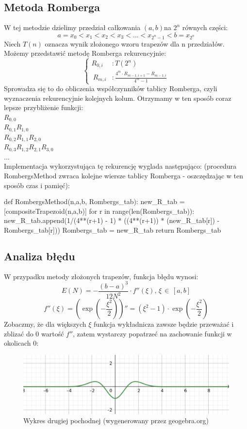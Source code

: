 \documentclass[a4paper]{article}
\begin{document}
\subsection{Metoda Romberga}
W tej metodzie dzielimy przedział całkowania $(a,b)$na $2^n$ równych części:
$$a = x_0 < x_1 < x_2 < x_3 < \ldots < x_{2^n-1} < b = x_{2^n}$$
Niech $T(n)$ oznacza wynik złożonego wzoru trapezów dla n przedziałów. Możemy przedstawić metodę Romberga rekurencyjnie:
$$
\begin{cases}
R_{0,i} &: T(2^n)\\ 
\ R_{m,i} &: \frac{4^m\cdot R_{m-1,i+1}-R_{m-1,i}}{4^m-1}
\end{cases}
$$
Sprowadza się to do obliczenia współczynników tablicy Romberga, czyli wyznaczenia rekurencyjnie kolejnych kolum. Otrzymamy w ten sposób coraz lepsze przybliżenie funkcji: \\
$R_{0,0}$ \\
$R_{0,1}$$R_{1,0}$ \\
$R_{0,2}$$R_{1,1}$$R_{2,0}$ \\
$R_{0,3}$$R_{1,2}$$R_{2,1}$$R_{3,0}$\\
$\ldots$ \\
Implementacja wykorzystująca tę rekurencję wyglada następująco: (procedura RombergsMethod zwraca kolejne wiersze tablicy Romberga - oszczędzając w ten sposób czas i pamięć):
\begin{python}
def RombergsMethod(n,a,b, Rombergs_tab):
    new_R_tab = [compositeTrapezoid(n,a,b)]
    for r in range(len(Rombergs_tab)):
        new_R_tab.append(1/(4**(r+1) - 1) * ((4**(r+1)) * (new_R_tab[r]) - Rombergs_tab[r]))
    Rombergs_tab = new_R_tab
    return Rombergs_tab
\end{python}
\subsection{Analiza błędu}
W przypadku metody złożonych trapezów, funkcja błędu wynosi:
$$E(N) = -\frac{(b-a)^3}{12N^2} \cdot f''(\xi), \,\xi\, \in \, [a,b]$$
$$f''(\xi) = \left(\exp(-\frac{\xi^2}{2})\right)'' = (\xi^2 - 1)\cdot\exp(-\frac{\xi^2}{2})$$
Zobaczmy, że dla większych $\xi$ funkcja wykładnicza zawsze będzie przeważać i zblizać do 0 wartość $f''$, zatem wystarczy popatrzeć na zachowanie funkcji w okolicach 0:

\begin{figure}[htbp]{}
\centerline{\includegraphics[scale=.4]{wykres_error.png}}
\caption{Wykres drugiej pochodnej (wygenerowany przez geogebra.org)}
\label{fig:error}
\end{figure}
\end{document}
